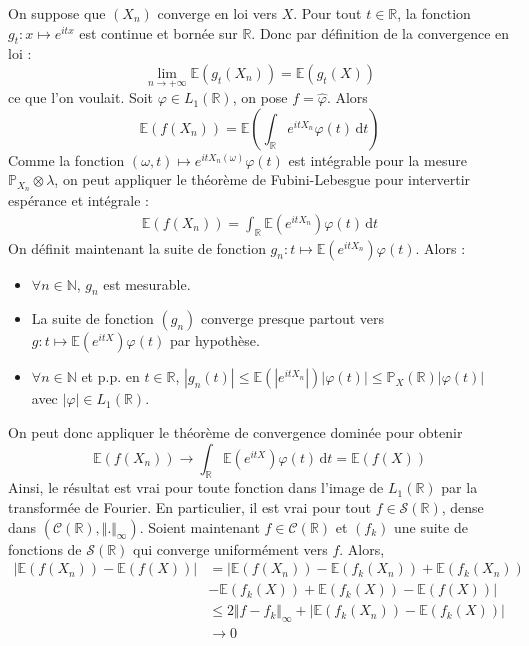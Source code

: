	\begin{demonstration}
		 On suppose que $(X_n)$ converge en loi vers $X$. Pour tout $t \in \mathbb{R}$, la fonction $g_t : x \mapsto e^{itx}$ est continue et bornée sur $\mathbb{R}$. Donc par définition de la convergence en loi :
		\[ \lim_{n \rightarrow +\infty} \mathbb{E}(g_t(X_n)) = \mathbb{E}(g_t(X)) \]
		ce que l'on voulait.
		\newpar
		 Soit $\varphi \in L_1(\mathbb{R})$, on pose $f = \widehat{\varphi}$. Alors
		\[ \mathbb{E}(f(X_n)) = \mathbb{E} \left ( \int_{\mathbb{R}} e^{itX_n} \varphi(t) \, \mathrm{d}t \right ) \]
		Comme la fonction $(\omega, t) \mapsto e^{itX_n(\omega)} \varphi(t)$ est intégrable pour la mesure $\mathbb{P}_{X_n} \otimes \lambda$, on peut appliquer le théorème de Fubini-Lebesgue pour intervertir espérance et intégrale :
		\begin{align*}
			\mathbb{E}(f(X_n)) = \int_{\mathbb{R}} \mathbb{E} (e^{itX_n}) \varphi(t) \, \mathrm{d}t
		\end{align*}
		On définit maintenant la suite de fonction $g_n : t \mapsto \mathbb{E} (e^{itX_n}) \varphi(t)$. Alors :
		\begin{itemize}
			\item $\forall n \in \mathbb{N}$, $g_n$ est mesurable.
			\item La suite de fonction $(g_n)$ converge presque partout vers $g : t \mapsto \mathbb{E} (e^{itX}) \varphi(t)$ par hypothèse.
			\item $\forall n \in \mathbb{N}$ et p.p. en $t \in \mathbb{R}$, $|g_n(t)| \leq \mathbb{E} (|e^{itX_n}|) |\varphi(t)| \leq \mathbb{P}_X(\mathbb{R}) |\varphi(t)|$ avec $|\varphi| \in L_1(\mathbb{R})$.
		\end{itemize}
		On peut donc appliquer le théorème de convergence dominée pour obtenir
		\[ \mathbb{E}(f(X_n)) \longrightarrow \int_{\mathbb{R}} \mathbb{E} (e^{itX}) \varphi(t) \, \mathrm{d}t = \mathbb{E}(f(X)) \]
		Ainsi, le résultat est vrai pour toute fonction dans l'image de $L_1(\mathbb{R})$ par la transformée de Fourier. En particulier, il est vrai pour tout $f \in \mathcal{S}(\mathbb{R})$, dense dans $(\mathcal{C}(\mathbb{R}), \Vert . \Vert_\infty)$. Soient maintenant $f \in \mathcal{C}(\mathbb{R})$ et $(f_k)$ une suite de fonctions de $\mathcal{S}(\mathbb{R})$ qui converge uniformément vers $f$. Alors,
		\begin{align*}
			|\mathbb{E}(f(X_n)) - \mathbb{E}(f(X))| &= |\mathbb{E}(f(X_n)) - \mathbb{E}(f_k(X_n)) + \mathbb{E}(f_k(X_n)) \\
			&- \mathbb{E}(f_k(X)) + \mathbb{E}(f_k(X)) - \mathbb{E}(f(X))| \\
			&\leq 2 \Vert f - f_k \Vert_\infty + |\mathbb{E}(f_k(X_n)) - \mathbb{E}(f_k(X))| \\
			&\longrightarrow 0
		\end{align*}
	\end{demonstration}

